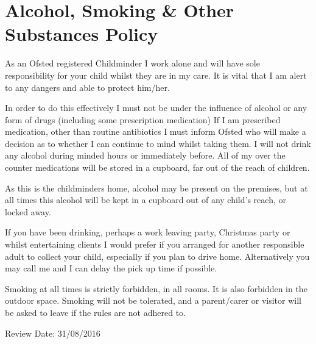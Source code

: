 
\section{Alcohol, Smoking \& Other Substances Policy}

As an Ofsted registered Childminder I work alone and will have sole
responsibility for your child whilst they are in my care. It is vital
that I am alert to any dangers and able to protect him/her.

In order to do this effectively I must not be under the influence of
alcohol or any form of drugs (including some prescription medication) If
I am prescribed medication, other than routine antibiotics I must inform
Ofsted who will make a decision as to whether I can continue to mind
whilst taking them. I will not drink any alcohol during minded hours or
immediately before. All of my over the counter medications will be
stored in a cupboard, far out of the reach of children.

As this is the childminders home, alcohol may be present on the
premises, but at all times this alcohol will be kept in a cupboard out
of any child's reach, or locked away.

If you have been drinking, perhaps a work leaving party, Christmas party
or whilst entertaining clients I would prefer if you arranged for
another responsible adult to collect your child, especially if you plan
to drive home. Alternatively you may call me and I can delay the pick up
time if possible.

Smoking at all times is strictly forbidden, in all rooms. It is also
forbidden in the outdoor space. Smoking will not be tolerated, and a
parent/carer or visitor will be asked to leave if the rules are not
adhered to.

Review Date: 31/08/2016


